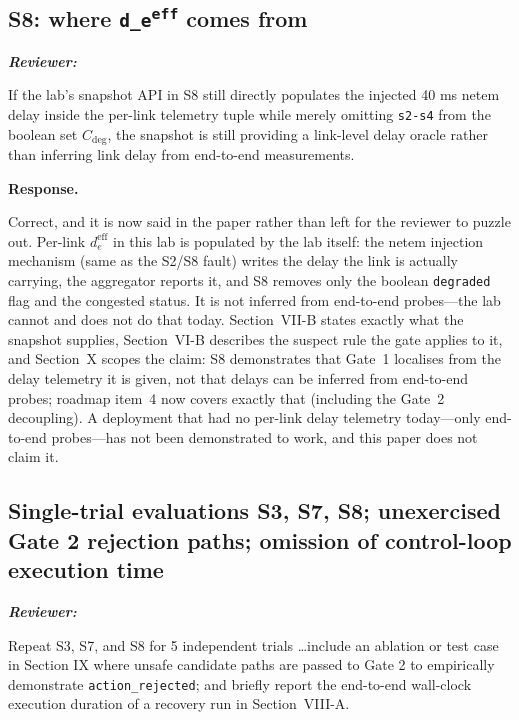 \documentclass[11pt,a4paper]{article}
\newenvironment{reviewer}{\par\medskip\noindent\begin{minipage}{\linewidth}\small\itshape\color{quote}\textbf{Reviewer:}\par}{\end{minipage}\medskip\par}
\newenvironment{response}{\par\noindent\begin{minipage}{\linewidth}\small\textbf{Response.}\par}{\end{minipage}\medskip\par}
\begin{document}
\subsection{S8: where \texttt{d\_e\textsuperscript{eff}} comes from}

\begin{reviewer}
If the lab's snapshot API in S8 still directly populates the injected
40 ms netem delay inside the per-link telemetry tuple while merely omitting
\texttt{s2-s4} from the boolean set $C_{\mathrm{deg}}$, the snapshot is
still providing a link-level delay oracle rather than inferring link delay
from end-to-end measurements.
\end{reviewer}

\begin{response}
Correct, and it is now said in the paper rather than left for the reviewer
to puzzle out. Per-link $d^{\mathrm{eff}}_e$ in this lab is populated by the
lab itself: the netem injection mechanism (same as the S2/S8 fault) writes
the delay the link is actually carrying, the aggregator reports it, and S8
removes only the boolean \texttt{degraded} flag and the congested status.
It is not inferred from end-to-end probes---the lab cannot and does not
do that today. Section~VII-B states exactly what the snapshot supplies,
Section~VI-B describes the suspect rule the gate applies to it, and
Section~X scopes the claim: S8 demonstrates that Gate~1 localises from
the delay telemetry it is given, not that delays can be inferred from
end-to-end probes; roadmap item~4 now covers exactly that (including the
Gate~2 decoupling). A deployment that had no per-link delay telemetry
today—only end-to-end probes—has not been demonstrated to work, and this
paper does not claim it.
\end{response}

\subsection{Single-trial evaluations S3, S7, S8; unexercised Gate 2 rejection
paths; omission of control-loop execution time}

\begin{reviewer}
Repeat S3, S7, and S8 for 5 independent trials \dots include an ablation or
test case in Section IX where unsafe candidate paths are passed to Gate 2 to
empirically demonstrate \texttt{action\_rejected}; and briefly report the
end-to-end wall-clock execution duration of a recovery run in Section~VIII-A.
\end{reviewer}
\end{document}
